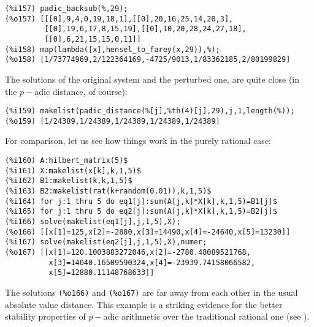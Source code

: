 \documentclass[fleqn]{cas-sc}
\begin{document}
\begin{verbatim}
(%i157)	padic_backsub(%,29);
(%o157)	[[[0],9,4,0,19,18,1],[[0],20,16,25,14,20,3],
         [[0],19,6,17,8,15,19],[[0],10,20,28,24,27,18],
         [[0],6,21,15,15,0,11]]
(%i158)	map(lambda([x],hensel_to_farey(x,29)),%);
(%o158)	[1/73774969,2/122364169,-4725/9013,1/83362185,2/80199829]
\end{verbatim}
The solutions of the original system and the perturbed one, are quite close
(in the $p-$adic distance, of course):
\begin{verbatim}
(%i159)	makelist(padic_distance(%[j],%th(4)[j],29),j,1,length(%));
(%o159)	[1/24389,1/24389,1/24389,1/24389,1/24389]
\end{verbatim}
For comparison, let us see how things work in the purely rational case:
\begin{verbatim}
(%i160)	A:hilbert_matrix(5)$
(%i161)	X:makelist(x[k],k,1,5)$
(%i162)	B1:makelist(k,k,1,5)$
(%i163)	B2:makelist(rat(k+random(0.01)),k,1,5)$
(%i164)	for j:1 thru 5 do eq1[j]:sum(A[j,k]*X[k],k,1,5)=B1[j]$
(%i165)	for j:1 thru 5 do eq2[j]:sum(A[j,k]*X[k],k,1,5)=B2[j]$
(%i166)	solve(makelist(eq1[j],j,1,5),X);
(%o166)	[[x[1]=125,x[2]=-2880,x[3]=14490,x[4]=-24640,x[5]=13230]]
(%i167)	solve(makelist(eq2[j],j,1,5),X),numer;
(%o167)	[[x[1]=120.1003883272046,x[2]=-2780.48089521768,
          x[3]=14040.16509590324,x[4]=-23939.74158066582,
          x[5]=12880.11148768633]]
\end{verbatim}
The solutions \texttt{(\%o166)} and \texttt{(\%o167)} are far away 
from each other in the usual absolute 	value distance. This example
is a striking evidence for the better stability 	properties of $p-$adic
arithmetic over the traditional rational one (see \cite{7,4,3,5,6,11}).
%
\end{document}
